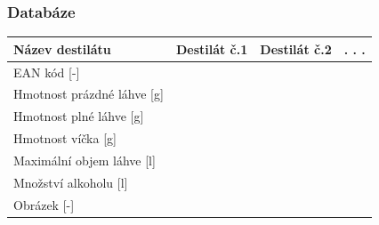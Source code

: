 \documentclass[%
  12pt,       				%
	t,                  %
	aspectratio=1610,   %
	unicode,						%
]{beamer}				    	%
\begin{document}
\begin{frame} %
    \frametitle{Databáze}
    \vspace{1cm}
    \begin{table}[!h]
    \centering
    \begin{tabular}{|l|l|l|l|}
    \hline
    Název destilátu & Destilát č.1   & Destilát č.2   &  . . . \\ \hline
    EAN kód [-]&  &    &        \\ \hline
    Hmotnost prázdné láhve [g] &    &  &        \\ \hline
    Hmotnost plné láhve [g] &    &    &  \\ \hline
    Hmotnost víčka [g] &    &    &  \\ \hline
    Maximální objem láhve [l] &    &    &  \\ \hline
    Množství alkoholu [l] &    &    &  \\ \hline
    Obrázek [-] &    &    &  \\ \hline
    \end{tabular}
    \end{table}
\end{frame}
\end{document}
